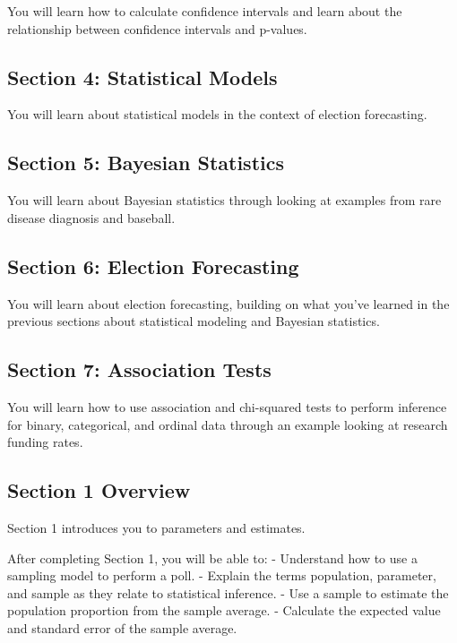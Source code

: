 \documentclass[
]{article}
\begin{document}
You will learn how to calculate confidence intervals and learn about the
relationship between confidence intervals and p-values.

\hypertarget{section-4-statistical-models}{%
\subsection{Section 4: Statistical
Models}\label{section-4-statistical-models}}

You will learn about statistical models in the context of election
forecasting.

\hypertarget{section-5-bayesian-statistics}{%
\subsection{Section 5: Bayesian
Statistics}\label{section-5-bayesian-statistics}}

You will learn about Bayesian statistics through looking at examples
from rare disease diagnosis and baseball.

\hypertarget{section-6-election-forecasting}{%
\subsection{Section 6: Election
Forecasting}\label{section-6-election-forecasting}}

You will learn about election forecasting, building on what you've
learned in the previous sections about statistical modeling and Bayesian
statistics.

\hypertarget{section-7-association-tests}{%
\subsection{Section 7: Association
Tests}\label{section-7-association-tests}}

You will learn how to use association and chi-squared tests to perform
inference for binary, categorical, and ordinal data through an example
looking at research funding rates.

\hypertarget{section-1-overview}{%
\subsection{Section 1 Overview}\label{section-1-overview}}

Section 1 introduces you to parameters and estimates.

After completing Section 1, you will be able to: - Understand how to use
a sampling model to perform a poll. - Explain the terms population,
parameter, and sample as they relate to statistical inference. - Use a
sample to estimate the population proportion from the sample average. -
Calculate the expected value and standard error of the sample average.
\end{document}
